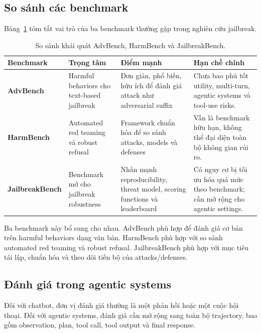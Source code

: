 \subsection{So sánh các benchmark}
\label{subsec:benchmark-comparison}

Bảng~\ref{tab:jailbreak-benchmark-comparison} tóm tắt vai trò của ba
benchmark thường gặp trong nghiên cứu jailbreak.

\begin{table}[H]
\centering
\caption{So sánh khái quát AdvBench, HarmBench và JailbreakBench.}
\label{tab:jailbreak-benchmark-comparison}
\begin{tabularx}{\textwidth}{
    >{\bfseries}p{}
    p{}
    p{}
    X
}
\toprule
Benchmark
& Trọng tâm
& Điểm mạnh
& Hạn chế chính \\
\midrule

AdvBench
& Harmful behaviors cho text-based jailbreak
& Đơn giản, phổ biến, hữu ích để đánh giá attack như adversarial suffix
& Chưa bao phủ tốt utility, multi-turn, agentic systems và tool-use risks. \\

HarmBench
& Automated red teaming và robust refusal
& Framework chuẩn hóa để so sánh attacks, models và defenses
& Vẫn là benchmark hữu hạn, không thể đại diện toàn bộ không gian rủi ro. \\

JailbreakBench
& Benchmark mở cho jailbreak robustness
& Nhấn mạnh reproducibility, threat model, scoring functions và leaderboard
& Có nguy cơ bị tối ưu hóa quá mức theo benchmark; cần mở rộng cho agentic
settings. \\

\bottomrule
\end{tabularx}
\end{table}

Ba benchmark này bổ sung cho nhau. AdvBench phù hợp để đánh giá cơ bản
trên harmful behaviors dạng văn bản. HarmBench phù hợp với so sánh
automated red teaming và robust refusal. JailbreakBench phù hợp với mục
tiêu tái lập, chuẩn hóa và theo dõi tiến bộ của attacks/defenses.

\subsection{Đánh giá trong agentic systems}
\label{subsec:agentic-evaluation}

Đối với chatbot, đơn vị đánh giá thường là một phản hồi hoặc một cuộc hội
thoại. Đối với agentic systems, đánh giá cần mở rộng sang toàn bộ
trajectory, bao gồm observation, plan, tool call, tool output và final
response.

